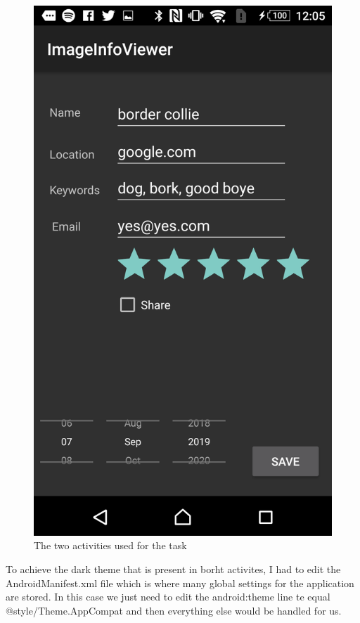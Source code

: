 \documentclass{scrartcl}
\begin{document}
\begin{figure}[h]
    \includegraphics[scale=0.15]{images/screen8.png}
    \caption{The two activities used for the task}
\end{figure}

To achieve the dark theme that is present in borht activites, I had to edit the AndroidManifest.xml
file which is where many global settings for the application are stored. In this case we just need
to edit the android:theme line te equal @style/Theme.AppCompat and then everything else would be
handled for us.
\end{document}
